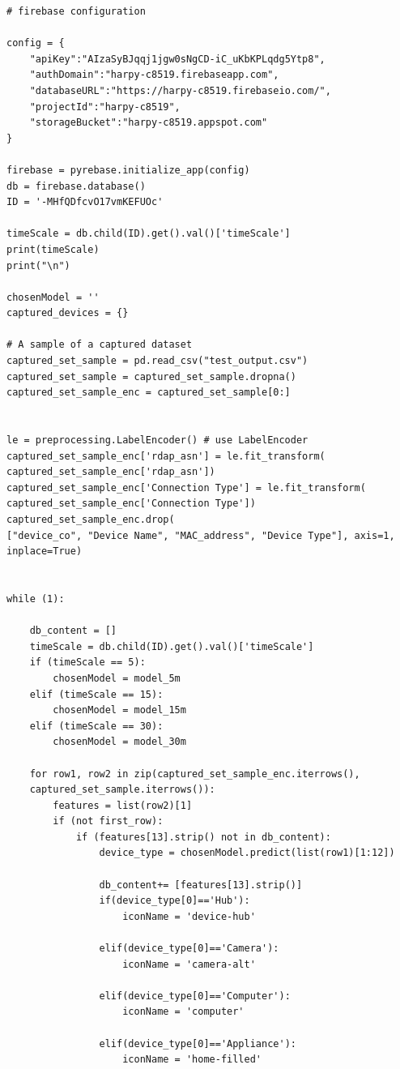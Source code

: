 \documentclass{article}
\begin{document}
\begin{appendices}
\begin{verbatim}
# firebase configuration

config = {
    "apiKey":"AIzaSyBJqqj1jgw0sNgCD-iC_uKbKPLqdg5Ytp8",
    "authDomain":"harpy-c8519.firebaseapp.com",
    "databaseURL":"https://harpy-c8519.firebaseio.com/",
    "projectId":"harpy-c8519",
    "storageBucket":"harpy-c8519.appspot.com"
}

firebase = pyrebase.initialize_app(config)
db = firebase.database()
ID = '-MHfQDfcvO17vmKEFUOc'

timeScale = db.child(ID).get().val()['timeScale']
print(timeScale)
print("\n")

chosenModel = ''
captured_devices = {}

# A sample of a captured dataset
captured_set_sample = pd.read_csv("test_output.csv") 
captured_set_sample = captured_set_sample.dropna()
captured_set_sample_enc = captured_set_sample[0:]


le = preprocessing.LabelEncoder() # use LabelEncoder
captured_set_sample_enc['rdap_asn'] = le.fit_transform(
captured_set_sample_enc['rdap_asn'])
captured_set_sample_enc['Connection Type'] = le.fit_transform(
captured_set_sample_enc['Connection Type'])
captured_set_sample_enc.drop(
["device_co", "Device Name", "MAC_address", "Device Type"], axis=1, 
inplace=True)


while (1):

    db_content = []
    timeScale = db.child(ID).get().val()['timeScale']
    if (timeScale == 5):
        chosenModel = model_5m
    elif (timeScale == 15):
        chosenModel = model_15m
    elif (timeScale == 30):
        chosenModel = model_30m
    
    for row1, row2 in zip(captured_set_sample_enc.iterrows(), 
    captured_set_sample.iterrows()):
        features = list(row2)[1]
        if (not first_row):
            if (features[13].strip() not in db_content):
                device_type = chosenModel.predict(list(row1)[1:12])
                
                db_content+= [features[13].strip()]
                if(device_type[0]=='Hub'):
                    iconName = 'device-hub'
                    
                elif(device_type[0]=='Camera'):
                    iconName = 'camera-alt'
                    
                elif(device_type[0]=='Computer'):
                    iconName = 'computer'
                  
                elif(device_type[0]=='Appliance'):
                    iconName = 'home-filled'
                   

\end{verbatim}
\end{appendices}
\end{document}
